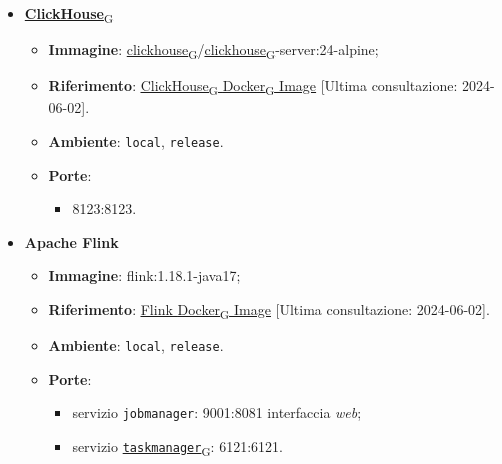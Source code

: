 \begin{itemize}
	\item \href{https://7last.github.io/docs/pb/documentazione-interna/glossario\#clickhouse}{\textbf{ClickHouse}\textsubscript{G}}
	      \begin{itemize}
		      \item \textbf{Immagine}: \href{https://7last.github.io/docs/pb/documentazione-interna/glossario\#clickhouse}{clickhouse\textsubscript{G}}/\href{https://7last.github.io/docs/pb/documentazione-interna/glossario\#clickhouse}{clickhouse\textsubscript{G}}-server:24-alpine;
		      \item \textbf{Riferimento}: \underline{\href{https://hub.docker.com/r/clickhouse/clickhouse-server}{\href{https://7last.github.io/docs/pb/documentazione-interna/glossario\#clickhouse}{ClickHouse\textsubscript{G}} \href{https://7last.github.io/docs/pb/documentazione-interna/glossario\#docker}{Docker\textsubscript{G}} Image}} [Ultima consultazione: 2024-06-02].
		      \item \textbf{Ambiente}: \texttt{local}, \texttt{release}.
		      \item \textbf{Porte}:
		            \begin{itemize}
			            \item 8123:8123.
		            \end{itemize}
	      \end{itemize}

	\item \textbf{Apache Flink}
	      \begin{itemize}
		      \item \textbf{Immagine}: flink:1.18.1-java17;
		      \item \textbf{Riferimento}: \underline{\href{https://hub.docker.com/_/flink}{Flink \href{https://7last.github.io/docs/pb/documentazione-interna/glossario\#docker}{Docker\textsubscript{G}} Image}} [Ultima consultazione: 2024-06-02].
		      \item \textbf{Ambiente}: \texttt{local}, \texttt{release}.
		      \item \textbf{Porte}:
		            \begin{itemize}
			            \item servizio \texttt{jobmanager}: 9001:8081 interfaccia \textit{web};
			            \item servizio \href{https://7last.github.io/docs/pb/documentazione-interna/glossario\#taskmanager}{\texttt{taskmanager}\textsubscript{G}}: 6121:6121.
		            \end{itemize}
	      \end{itemize}


\end{itemize}

